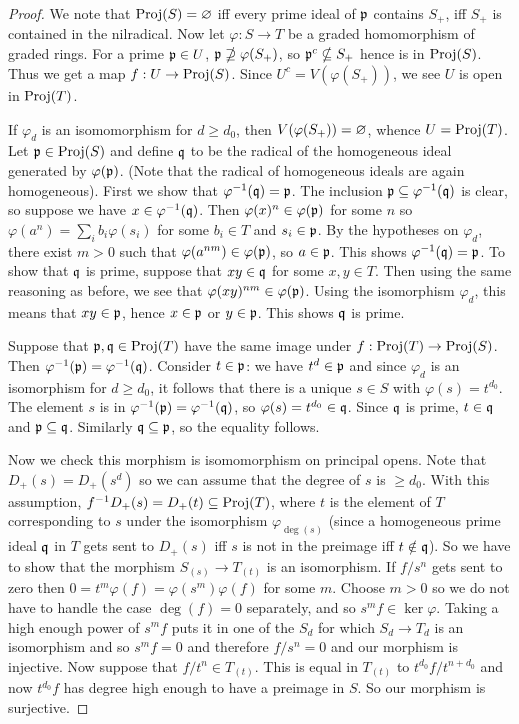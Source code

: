 \documentclass[11pt]{book}
\theoremstyle{definition}
\begin{document}
\begin{proof}
We note that $\mathrm{Proj}(S)=\varnothing$ iff every prime ideal of $\mathfrak{p}$ contains $S_+$, iff $S_+$ is contained in the nilradical. Now let $\varphi:S\to T$ be a graded homomorphism of graded rings. For a prime $\mathfrak{p}\in U$, $\mathfrak{p}\nsupseteq \varphi(S_+)$, so $\mathfrak{p}^c\nsubseteq S_+$ hence is in $\mathrm{Proj}(S)$. Thus we get a map $f:U\to\mathrm{Proj}(S)$. Since $U^c=V(\varphi(S_+))$, we see $U$ is open in $\mathrm{Proj}(T)$.\par
If $\varphi_d$ is an isomomorphism for $d\geq d_0$, then $V(\varphi(S_+))=\varnothing$, whence $U=\mathrm{Proj}(T)$. Let $\mathfrak{p}\in\mathrm{Proj}(S)$ and define $\mathfrak{q}$ to be the radical of the homogeneous ideal generated by $\varphi(\mathfrak{p})$. (Note that the radical of homogeneous ideals are again homogeneous). First we show that $\varphi^{-1}(\mathfrak{q})=\mathfrak{p}$. The inclusion $\mathfrak{p}\subseteq\varphi^{-1}(\mathfrak{q})$ is clear, so suppose we have $x\in\varphi^{-1}(\mathfrak{q})$. Then $\varphi(x)^n\in\varphi(\mathfrak{p})$ for some $n$ so $\varphi(a^n)=\sum_ib_i\varphi(s_i)$ for some $b_i\in T$ and $s_i\in\mathfrak{p}$. By the hypotheses on $\varphi_d$, there exist $m>0$ such that $\varphi(a^{nm})\in\varphi(\mathfrak{p})$, so $a\in\mathfrak{p}$. This shows $\varphi^{-1}(\mathfrak{q})=\mathfrak{p}$. To show that $\mathfrak{q}$ is prime, suppose that $xy\in\mathfrak{q}$ for some $x,y\in T$. Then using the same reasoning as before, we see that $\varphi(xy)^{nm}\in\varphi(\mathfrak{p})$. Using the isomorphism $\varphi_d$, this means that $xy\in\mathfrak{p}$, hence $x\in\mathfrak{p}$ or $y\in\mathfrak{p}$. This shows $\mathfrak{q}$ is prime.\par
Suppose that $\mathfrak{p},\mathfrak{q}\in\mathrm{Proj}(T)$ have the same image under $f:\mathrm{Proj}(T)\to\mathrm{Proj}(S)$. Then $\varphi^{-1}(\mathfrak{p})=\varphi^{-1}(\mathfrak{q})$. Consider $t\in\mathfrak{p}$: we have $t^{d}\in\mathfrak{p}$ and since $\varphi_d$ is an isomorphism for $d\geq d_0$, it follows that there is a unique $s\in S$ with $\varphi(s)=t^{d_0}$. The element $s$ is in $\varphi^{-1}(\mathfrak{p})=\varphi^{-1}(\mathfrak{q})$, so $\varphi(s)=t^{d_0}\in\mathfrak{q}$. Since $\mathfrak{q}$ is prime, $t\in\mathfrak{q}$ and $\mathfrak{p}\subseteq\mathfrak{q}$. Similarly $\mathfrak{q}\subseteq\mathfrak{p}$, so the equality follows.\par
Now we check this morphism is isomomorphism on principal opens. Note that $D_+(s)=D_+(s^d)$ so we can assume that the degree of $s$ is $\geq d_0$. With this assumption, $f^{-1}D_+(s)=D_+(t)\subseteq\mathrm{Proj}(T)$, where $t$ is the element of $T$ corresponding to $s$ under the isomorphism $\varphi_{\deg(s)}$ (since a homogeneous prime ideal $\mathfrak{q}$ in $T$ gets sent to $D_+(s)$ iff $s$ is not in the preimage iff $t\notin\mathfrak{q}$). So we have to show that the morphism $S_{(s)}\to T_{(t)}$ is an isomorphism. If $f/s^n$ gets sent to zero then $0=t^m\varphi(f)=\varphi(s^m)\varphi(f)$ for some $m$. Choose $m>0$ so we do not have to handle the case $\deg(f)=0$ separately, and so $s^mf\in\ker\varphi$. Taking a high enough power of $s^mf$ puts it in one of the $S_d$ for which $S_d\to T_d$ is an isomorphism and so $s^mf=0$ and therefore $f/s^n=0$ and our morphism is injective. Now suppose that $f/t^n\in T_{(t)}$. This is equal in $T_{(t)}$ to $t^{d_0}f/t^{n+d_0}$ and now $t^{d_0}f$ has degree high enough to have a preimage in $S$. So our morphism is surjective.
\end{proof}
\end{document}
